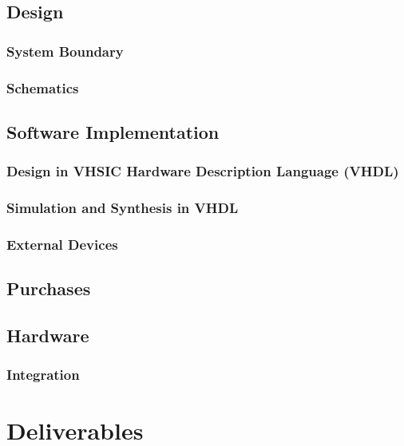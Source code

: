 \documentclass[paper=usletter, fontsize=12pt]{article}
\begin{document}
        \subsection{Design}

            \subsubsection{System Boundary}

            \subsubsection{Schematics}

        \subsection{Software Implementation}

            \subsubsection{Design in VHSIC Hardware Description Language (VHDL)}

            \subsubsection{Simulation and Synthesis in VHDL}

            \subsubsection{External Devices}

        \subsection{Purchases}

        \subsection{Hardware}

            \subsubsection{Integration}

    \section{Deliverables}
\end{document}

